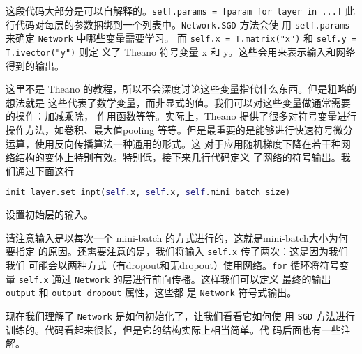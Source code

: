 这段代码大部分是可以自解释的。\lstinline!self.params = [param for layer in ...]!
此行代码对每层的参数捆绑到一个列表中。\lstinline!Network.SGD! 方法会使
用 \lstinline!self.params! 来确定 \lstinline!Network! 中哪些变量需要学习。
而 \lstinline!self.x = T.matrix("x")! 和 \lstinline!self.y = T.ivector("y")! 则定
义了 Theano 符号变量 x 和 y。这些会用来表示输入和网络得到的输出。

这里不是 Theano 的教程，所以不会深度讨论这些变量指代什么东西。但是粗略的想法就是
这些代表了数学变量，而非显式的值。我们可以对这些变量做通常需要的操作：加减乘除，
作用函数等等。实际上，Theano 提供了很多对符号变量进行操作方法，如卷积、最大值\gls*{pooling}
等等。但是最重要的是能够进行快速符号微分运算，使用反向传播算法一种通用的形式。这
对于应用随机梯度下降在若干种网络结构的变体上特别有效。特别低，接下来几行代码定义
了网络的符号输出。我们通过下面这行

\begin{lstlisting}[language=Python]
init_layer.set_inpt(self.x, self.x, self.mini_batch_size)
\end{lstlisting}

设置初始层的输入。

请注意输入是以每次一个 mini-batch 的方式进行的，这就是\gls*{mini-batch}大小为何要指定
的原因。还需要注意的是，我们将输入 \lstinline!self.x! 传了两次：这是因为我们我们
可能会以两种方式（有dropout和无dropout）使用网络。\lstinline!for! 循环将符号变
量 \lstinline!self.x! 通过 \lstinline!Network! 的层进行前向传播。这样我们可以定义
最终的输出 \lstinline!output! 和 \lstinline!output_dropout! 属性，这些都
是 \lstinline!Network! 符号式输出。

现在我们理解了 \lstinline!Network! 是如何初始化了，让我们看看它如何使
用 \lstinline!SGD! 方法进行训练的。代码看起来很长，但是它的结构实际上相当简单。代
码后面也有一些注解。

